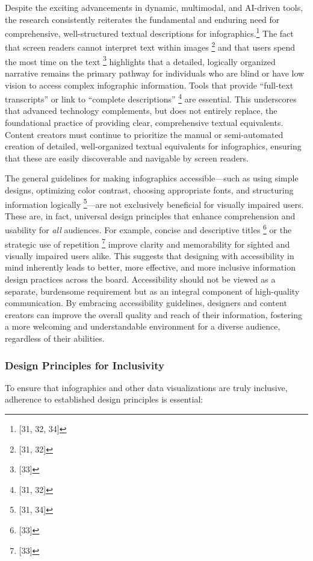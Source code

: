 Despite the exciting advancements in dynamic, multimodal, and AI-driven tools, the research consistently reiterates the fundamental and enduring need for comprehensive, well-structured textual descriptions for infographics.\footnote{[31, 32, 34]} The fact that screen readers cannot interpret text within images \footnote{[31, 32]} and that users spend the most time on the text \footnote{[33]} highlights that a detailed, logically organized narrative remains the primary pathway for individuals who are blind or have low vision to access complex infographic information. Tools that provide ``full-text transcripts'' or link to ``complete descriptions'' \footnote{[31, 32]} are essential. This underscores that advanced technology complements, but does not entirely replace, the foundational practice of providing clear, comprehensive textual equivalents. Content creators must continue to prioritize the manual or semi-automated creation of detailed, well-organized textual equivalents for infographics, ensuring that these are easily discoverable and navigable by screen readers.

The general guidelines for making infographics accessible---such as using simple designs, optimizing color contrast, choosing appropriate fonts, and structuring information logically \footnote{[31, 34]}---are not exclusively beneficial for visually impaired users. These are, in fact, universal design principles that enhance comprehension and usability for \textit{all} audiences. For example, concise and descriptive titles \footnote{[33]} or the strategic use of repetition \footnote{[33]} improve clarity and memorability for sighted and visually impaired users alike. This suggests that designing with accessibility in mind inherently leads to better, more effective, and more inclusive information design practices across the board. Accessibility should not be viewed as a separate, burdensome requirement but as an integral component of high-quality communication. By embracing accessibility guidelines, designers and content creators can improve the overall quality and reach of their information, fostering a more welcoming and understandable environment for a diverse audience, regardless of their abilities.

\subsubsection{Design Principles for Inclusivity}
To ensure that infographics and other data visualizations are truly inclusive, adherence to established design principles is essential:

